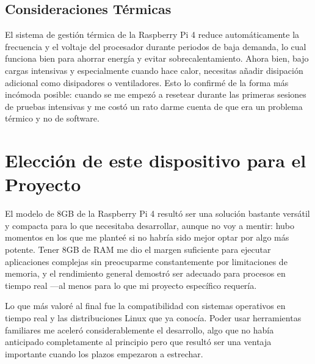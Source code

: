     \subsection{Consideraciones Térmicas}
    El sistema de gestión térmica de la Raspberry Pi 4 reduce automáticamente la frecuencia y el voltaje del procesador durante periodos de baja demanda, lo cual funciona bien para ahorrar energía y evitar sobrecalentamiento. Ahora bien, bajo cargas intensivas y especialmente cuando hace calor, necesitas añadir disipación adicional como disipadores o ventiladores. Esto lo confirmé de la forma más incómoda posible: cuando se me empezó a resetear durante las primeras sesiones de pruebas intensivas y me costó un rato darme cuenta de que era un problema térmico y no de software.

\section{Elección de este dispositivo para el Proyecto}
    El modelo de 8GB de la Raspberry Pi 4 resultó ser una solución bastante versátil y compacta para lo que necesitaba desarrollar, aunque no voy a mentir: hubo momentos en los que me planteé si no habría sido mejor optar por algo más potente. Tener 8GB de RAM me dio el margen suficiente para ejecutar aplicaciones complejas sin preocuparme constantemente por limitaciones de memoria, y el rendimiento general demostró ser adecuado para procesos en tiempo real —al menos para lo que mi proyecto específico requería.
    
    Lo que más valoré al final fue la compatibilidad con sistemas operativos en tiempo real y las distribuciones Linux que ya conocía. Poder usar herramientas familiares me aceleró considerablemente el desarrollo, algo que no había anticipado completamente al principio pero que resultó ser una ventaja importante cuando los plazos empezaron a estrechar.